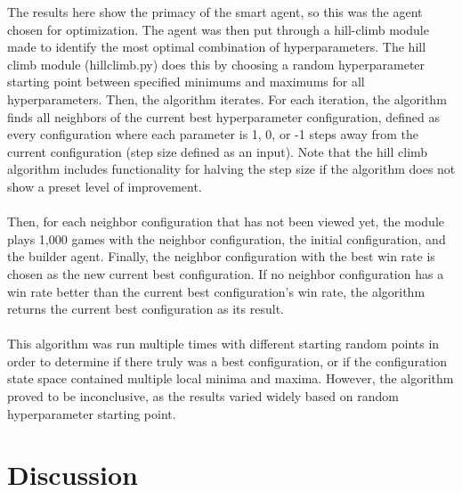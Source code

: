 \documentclass[a4paper, 11pt]{article}
\begin{document}
\noindent The results here show the primacy of the smart agent, so this was the agent chosen for optimization. The agent was then put through a hill-climb module made to identify the most optimal combination of hyperparameters. The hill climb module (hillclimb.py) does this by choosing a random hyperparameter starting point between specified minimums and maximums for all hyperparameters. Then, the algorithm iterates. For each iteration, the algorithm finds all neighbors of the current best hyperparameter configuration, defined as every configuration where each parameter is 1, 0, or -1 steps away from the current configuration (step size defined as an input). Note that the hill climb algorithm includes functionality for halving the step size if the algorithm does not show a preset level of improvement.
\\ \\
\noindent Then, for each neighbor configuration that has not been viewed yet, the module plays 1,000 games with the neighbor configuration, the initial configuration, and the builder agent. Finally, the neighbor configuration with the best win rate is chosen as the new current best configuration. If no neighbor configuration has a win rate better than the current best configuration's win rate, the algorithm returns the current best configuration as its result.
\\ \\
\noindent This algorithm was run multiple times with different starting random points in order to determine if there truly was a best configuration, or if the configuration state space contained multiple local minima and maxima. However, the algorithm proved to be inconclusive, as the results varied widely based on random hyperparameter starting point.

\section{Discussion}
\end{document}
